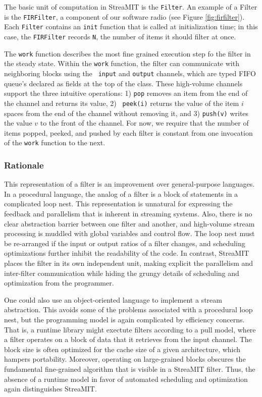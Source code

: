 The basic unit of computation in StreaMIT is the {\tt Filter}.  An
example of a Filter is the {\tt FIRFilter}, a component of our
software radio (see Figure \ref{fig:firfilter}).  Each {\tt Filter}
contains an {\tt init} function that is called at initialization time;
in this case, the {\tt FIRFilter} records {\tt N}, the number of items
it should filter at once.

The {\tt work} function describes the most fine grained execution step
fo the filter in the steady state.  Within the {\tt work} function,
the filter can communicate with neighboring blocks using the {\tt
input} and {\tt output} channels, which are typed FIFO queue's
declared as fields at the top of the class.  These high-volume
channels support the three intuitive operations: 1) {\tt pop} removes
an item from the end of the channel and returns its value, 2) {\tt
peek(i)} returns the value of the item $i$ spaces from the end of the
channel without removing it, and 3) {\tt push(v)} writes the value $v$
to the front of the channel.  For now, we require that the number of
items popped, peeked, and pushed by each filter is constant from one
invocation of the {\tt work} function to the next.

\subsubsection{Rationale}

This representation of a filter is an improvement over general-purpose
languages.  In a procedural language, the analog of a filter is a
block of statements in a complicated loop nest.  This representation
is unnatural for expressing the feedback and parallelism that is
inherent in streaming systems.  Also, there is no clear abstraction
barrier between one filter and another, and high-volume stream
processing is muddled with global variables and control flow.  The
loop nest must be re-arranged if the input or output ratios of a
filter changes, and scheduling optimizations further inhibit the
readability of the code.  In contrast, StreaMIT places the filter in
its own independent unit, making explicit the parallelism and
inter-filter communication while hiding the grungy details of
scheduling and optimization from the programmer.

One could also use an object-oriented language to implement a stream
abstraction.  This avoids some of the problems associated with a
procedural loop nest, but the programming model is again complicated
by efficiency concerns.  That is, a runtime library might exectute
filters according to a pull model, where a filter operates on a block
of data that it retrieves from the input channel.  The block size is
often optimized for the cache size of a given architecture, which
hampers portability.  Moreover, operating on large-grained blocks
obscures the fundamental fine-grained algorithm that is visible in a
StreaMIT filter.  Thus, the absence of a runtime model in favor of
automated scheduling and optimization again distinguishes StreaMIT.

